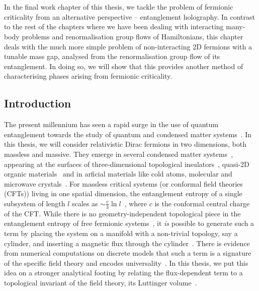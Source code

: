 \chapter{\chapG}\label{sec:Metals}

In the final work chapter of this thesis, we tackle the problem of fermionic criticality from an alternative perspective -- entanglement holography. In contrast to the rest of the chapters where we have been dealing with interacting many-body problems and renormalisation group flows of Hamiltonians, this chapter deals with the much more simple problem of non-interacting 2D fermions with a tunable mass gap, analysed from the renormalisation group flow of its entanglement. In doing so, we will show that this provides another method of characterising phases  arising from fermionic criticality.

\section{Introduction}
The present millennium has seen a rapid surge in the use of quantum entanglement towards the study of quantum and condensed matter systems~\cite{terhal_physicstoday_2003,horodecki2009quantum,eisert_entanglement_2010,laflorencie2016quantum,zeng2019,Erhard2020}.
In this thesis, we will consider relativistic Dirac fermions in two dimensions, both massless and massive. They emerge in several condensed matter systems~\cite{vafek_2014_diracreview}, appearing at the surfaces of three-dimensional topological insulators~\cite{bernevig_2013,cayssol2013,moessner_moore_2021,Rachel_2018}, quasi-2D organic materials~\cite{wang_2015,Wu_2016,ni_2022_dirac} and in arficial materials like cold atoms, molecular and microwave crystals~\cite{zhu_2007_coldatoms,Lepori_2010,Boada_2011,Kuno2018,Gomes2012,Yuan2016,bellec_2013}.
For massless critical systems (or conformal field theories (CFTs)) living in one spatial dimension, the entanglement entropy of a single subsystem of length \(l\) scales as \(\sim \frac{c}{3}\ln l\)~\cite{vidal2003entanglement,latorre_extanglement_2003,lattore_pra_2005,Jin_2004,lambert_2004,holzhey_1994,casini_2004_spinchain,calabrese2004,osborne2002entanglement,osterloh2002scaling}, where \(c\) is the conformal central charge of the CFT. While there is no geometry-independent topological piece in the entanglement entropy of free fermionic systems~\cite{Chen_2017,bueno_2017}, it {\it is} possible to generate such a term by placing the system on a manifold with a non-trivial topology, say a cylinder, and inserting a magnetic flux through the cylinder~\cite{Metlitski_2009,Arias_2015,Whitsitt_2017,Chen_2017,zhu_kagome_2018}.
There is evidence from numerical computations on discrete models that such a term is a signature of the specific field theory and encodes universality~\cite{zhu_kagome_2018,Hu_triangular_2019,crepel_2021}. In this thesis, we put this idea on a stronger analytical footing by relating the flux-dependent term to a topological invariant of the field theory, its Luttinger volume~\cite{luttinger1960fermi,luttinger1960ground,oshikawa2000topological,seki2017topological,Heath_2020,anirbanurg1,anirbanurg2}. 

